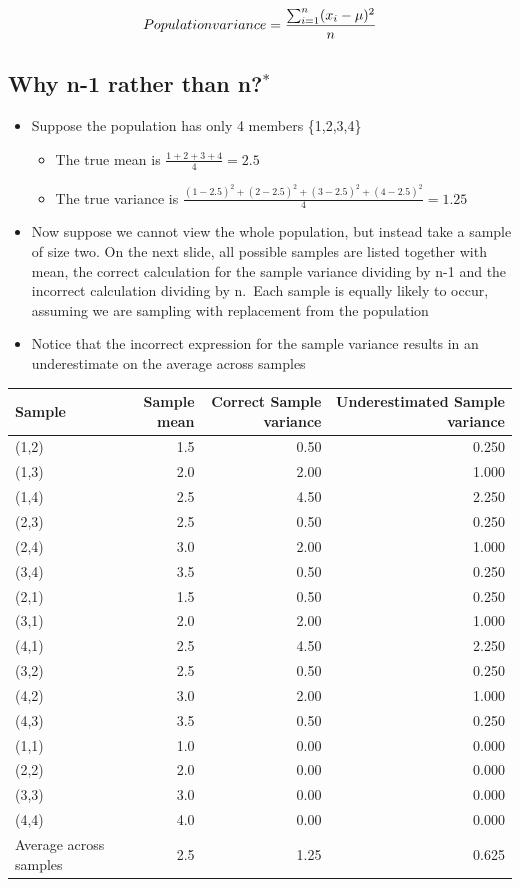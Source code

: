 \documentclass[
]{book}
\providecommand{\tightlist}{%
  \setlength{\itemsep}{0pt}\setlength{\parskip}{0pt}}
\begin{document}
\[Population\space variance = \frac{\sum_{i=1}^n(x_i-\mu)^2}{n}\]

\hypertarget{why-n-1-rather-than-n}{%
\subsection{\texorpdfstring{Why n-1 rather than n?\(^*\)}{Why n-1 rather than n?\^{}*}}\label{why-n-1-rather-than-n}}

\begin{itemize}
\tightlist
\item
  Suppose the population has only 4 members \{1,2,3,4\}

  \begin{itemize}
  \tightlist
  \item
    The true mean is \(\frac{1+2+3+4}{4} = 2.5\)
  \item
    The true variance is \(\frac{(1−2.5)^2+(2−2.5)^2+(3−2.5)^2+(4−2.5)^2}{4}=1.25\)
  \end{itemize}
\item
  Now suppose we cannot view the whole population, but instead take a sample of size two. On the next slide, all possible samples are listed together with mean, the correct calculation for the sample variance dividing by n-1 and the incorrect calculation dividing by n.~Each sample is equally likely to occur, assuming we are sampling with replacement from the population
\item
  Notice that the incorrect expression for the sample variance results in an underestimate on the average across samples
\end{itemize}

\begin{tabular}{l|r|r|r}
\hline
Sample & Sample mean & Correct Sample variance & Underestimated Sample variance\\
\hline
(1,2) & 1.5 & 0.50 & 0.250\\
\hline
(1,3) & 2.0 & 2.00 & 1.000\\
\hline
(1,4) & 2.5 & 4.50 & 2.250\\
\hline
(2,3) & 2.5 & 0.50 & 0.250\\
\hline
(2,4) & 3.0 & 2.00 & 1.000\\
\hline
(3,4) & 3.5 & 0.50 & 0.250\\
\hline
(2,1) & 1.5 & 0.50 & 0.250\\
\hline
(3,1) & 2.0 & 2.00 & 1.000\\
\hline
(4,1) & 2.5 & 4.50 & 2.250\\
\hline
(3,2) & 2.5 & 0.50 & 0.250\\
\hline
(4,2) & 3.0 & 2.00 & 1.000\\
\hline
(4,3) & 3.5 & 0.50 & 0.250\\
\hline
(1,1) & 1.0 & 0.00 & 0.000\\
\hline
(2,2) & 2.0 & 0.00 & 0.000\\
\hline
(3,3) & 3.0 & 0.00 & 0.000\\
\hline
(4,4) & 4.0 & 0.00 & 0.000\\
\hline
Average across samples & 2.5 & 1.25 & 0.625\\
\hline
\end{tabular}
\end{document}
